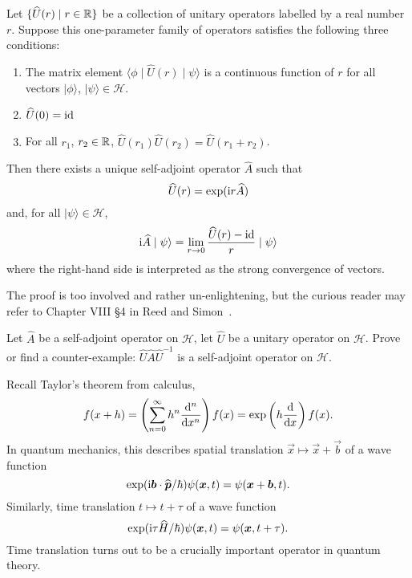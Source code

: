 \begin{theorem}[Stone]
Let $\{\widehat{U}(r)\mid r\in\mathbb{R}\}$ be a collection of unitary operators
labelled by a real number $r$. Suppose this one-parameter family of
operators satisfies the following three conditions:
\begin{enumerate}
\item The matrix element $\langle\phi\mid\widehat{U}(r)\mid\psi\rangle$
  is a continuous function of $r$ for all vectors $|\phi\rangle$, $|\psi\rangle\in\mathcal{H}$.
\item $\widehat{U}(0)=\operatorname{id}$
\item For all $r_{1}$, $r_{2}\in\mathbb{R}$,
  $\widehat{U}(r_{1})\widehat{U}(r_{2}) = \widehat{U}(r_{1}+r_{2})$.
\end{enumerate}
Then there exists a unique self-adjoint operator $\widehat{A}$ such that
\begin{equation}
\widehat{U}(r) = \exp(\mathrm{i} r\widehat{A})
\end{equation}
and, for all $|\psi\rangle\in\mathcal{H}$,
\begin{equation}
\mathrm{i}\widehat{A}\mid\psi\rangle
=\lim_{r\to0}\frac{\widehat{U}(r)-\operatorname{id}}{r}\mid\psi\rangle
\end{equation}
where the right-hand side is interpreted as the strong convergence of vectors.
\end{theorem}

The proof is too involved and rather un-enlightening, but the curious
reader may refer to Chapter VIII \S4 in Reed and
Simon~\cite{Reed:1972mp}.

\begin{exercise}
Let $\widehat{A}$ be a self-adjoint operator on $\mathcal{H}$,
let $\widehat{U}$ be a unitary operator on $\mathcal{H}$.
Prove or find a counter-example: $\widehat{U}\widehat{A}\widehat{U}^{-1}$
is a self-adjoint operator on $\mathcal{H}$.
\end{exercise}

\begin{example}
Recall Taylor's theorem from calculus,
\begin{equation}
f(x + h) = \left(\sum^{\infty}_{n=0}h^{n}\frac{\mathrm{d}^{n}}{\mathrm{d} x^{n}}\right)f(x)
= \exp\left(h\frac{\mathrm{d}}{\mathrm{d} x}\right)f(x).
\end{equation}
In quantum mechanics, this describes spatial translation $\vec{x}\mapsto\vec{x}+\vec{b}$ of a wave function
\begin{equation}
\exp(\mathrm{i} \boldsymbol{b}\cdot\widehat{\boldsymbol{p}}/\hbar)\psi(\boldsymbol{x},t) = \psi(\boldsymbol{x}+\boldsymbol{b},t).
\end{equation}
Similarly, time translation $t\mapsto t+\tau$ of a wave function
\begin{equation}
\exp(\mathrm{i}\tau\widehat{H}/\hbar)\psi(\boldsymbol{x},t)=\psi(\boldsymbol{x},t + \tau).
\end{equation}
Time translation turns out to be a crucially important operator in
quantum theory.
\end{example}


